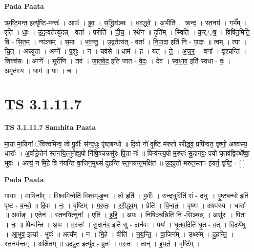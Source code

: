 \documentclass[17pt]{extarticle}
\begin{document}
\textbf{Pada Paata} \newline

ऋ॒ष्टि॒मन्त॒ इत्यृ॑ष्टि-मन्तः॑ । आपः॑ । इ॒व॒ । स॒द्ध्रिय॑ञ्चः । ध॒व॒द्ध्वे॒ ॥ अ॒भीति॑ । क्र॒न्द॒ । स्त॒नय॑ । गर्भ᳚म् । एति॑ । धाः॒ । उ॒द॒न्वतेत्यु॑दन्न् - वता᳚ । परीति॑ । दी॒य॒ । रथे॑न ॥ दृति᳚म् । स्विति॑ । क॒र्.॒ष॒ । विषि॑त॒मिति॒ वि - सि॒त॒म् । न्य॑ञ्चम् । स॒माः । भ॒व॒न्तु॒ । उ॒द्वतेत्य॑त् - वता᳚ । नि॒पा॒दा इति॑ नि - पा॒दाः ॥ त्वम् । त्या । चि॒त् । अच्यु॑ता । अग्ने᳚ । प॒शुः । न । यव॑से ॥ धाम॑ । ह॒ । यत् । ते॒ । अ॒ज॒र॒ । वना᳚ । वृ॒श्चन्ति॑ । शिक्व॑सः ॥ अग्ने᳚ । भूरी॑णि । तव॑ । जा॒त॒वे॒द॒ इति॑ जात - वे॒दः॒ । देव॑ । स्व॒धा॒व॒ इति॑ स्वधा - वः॒ । अ॒मृत॑स्य । धाम॑ ॥ याः । च॒ ।  \newline




\section*{ TS 3.1.11.7 }

\textbf{TS 3.1.11.7 } \newline
\textbf{Samhita Paata} \newline

मा॒या मा॒यिनां᳚ ॅविश्वमिन्व॒ त्वे पू॒र्वीः स॑न्द॒धुः पृ॑ष्टबन्धो ॥ दि॒वो नो॑ वृ॒ष्टिं म॑रुतो ररीद्ध्वं॒ प्रपि॑न्वत॒ वृष्णो॒ अश्व॑स्य॒ धाराः᳚ । अ॒र्वाङे॒तेन॑ स्तनयि॒त्नुनेह्य॒पो नि॑षि॒ञ्चन्नसु॑रः पि॒ता नः॑ ॥ पिन्व॑न्त्य॒पो म॒रुतः॑ सु॒दान॑वः॒ पयो॑ घृ॒तव॑द्वि॒दथे᳚ष्वा॒ भुवः॑ । अत्यं॒ न मि॒हे वि न॑यन्ति वा॒जिन॒मुथ्सं॑ दुहन्ति स्त॒नय॑न्त॒मक्षि॑तं ॥ उ॒द॒प्रुतो॑ मरुत॒स्ताꣳ इ॑यर्त॒ वृष्टिं॒ - [  ] \newline

\textbf{Pada Paata} \newline

मा॒याः । मा॒यिना᳚म् । वि॒श्व॒मि॒न्वेति॑ विश्वम्-इ॒न्व॒ । त्वे इति॑ । पू॒र्वीः । स॒न्द॒धुरिति॑ सं - द॒धुः । पृ॒ष्ट॒ब॒न्धो॒ इति॑ पृष्ट - ब॒न्धो॒ ॥ दि॒वः । नः॒ । वृ॒ष्टिम् । म॒रु॒तः॒ । र॒री॒द्ध्व॒म् । प्रेति॑ । पि॒न्व॒त॒ । वृष्णः॑ । अश्व॑स्य । धाराः᳚ ॥ अ॒र्वाङ् । ए॒तेन॑ । स्त॒न॒यि॒त्नुना᳚ । एति॑ । इ॒हि॒ । अ॒पः । नि॒षि॒ञ्चन्निति॑ नि -सि॒ञ्चन्न् । असु॑रः । पि॒ता । नः॒ ॥ पिन्व॑न्ति । अ॒पः । म॒रुतः॑ । सु॒दान॑व॒ इति॑ सु - दान॑वः । पयः॑ । घृ॒तव॒दिति॑ घृ॒त - व॒त् । वि॒दथे॑षु । आ॒भुव॒ इत्या᳚ - भुवः॑ ॥ अत्य᳚म् । न । मि॒हे । वीति॑ । न॒य॒न्ति॒ । वा॒जिन᳚म् । उथ्स᳚म् । दु॒ह॒न्ति॒ । स्त॒नय॑न्तम् । अक्षि॑तम् ॥ उ॒द॒प्रुत॒ इत्यु॑द - प्रुतः॑ । म॒रु॒तः॒ । तान् । इ॒य॒र्त॒ । वृष्टि᳚म् ।  \newline
\end{document}

